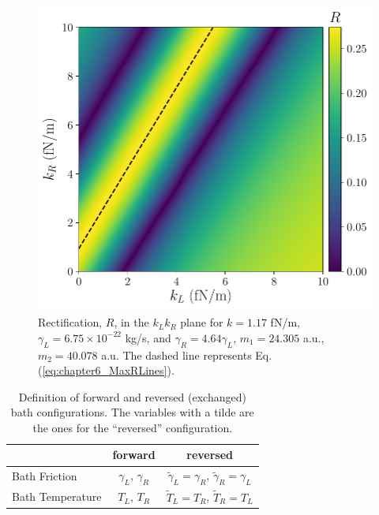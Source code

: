 \begin{figure}
  \center
  \includegraphics[width=0.75\linewidth]{Figures/RwMPlota.pdf}
  \caption{Rectification, $R$, in the $k_L k_R$ plane for $k = 1.17$ fN/m, $\gamma_L = 6.75\times 10^{-22}$ kg/s, and $\gamma_R = 4.64\gamma_L$, $m_1 = 24.305$ a.u., $m_2 = 40.078$ a.u. The dashed  line represents Eq.  (\ref{eq:chapter6_MaxRLines}).}
  \label{fig:Fig_rectification_K_plane}
\end{figure}

\begin{table}[]
\center
\caption{Definition of forward and reversed (exchanged) bath configurations. The variables with a tilde are the ones for the ``reversed'' configuration.}
\begin{tabular}{lcc}
\hline
& forward                & reversed                                                       \\ \hline
Bath Friction    & $\gamma_L$, $\gamma_R$ & $\tilde{\gamma}_L =\gamma_R $,  $\tilde{\gamma}_R =\gamma_L $   \\
Bath Temperature & $T_L$, $T_R$           & $\tilde{T}_L =T_R $,  $\tilde{T}_R =T_L $                     \\
\hline
\end{tabular}
\label{tab:reversed_bath}
\end{table}
%
%

